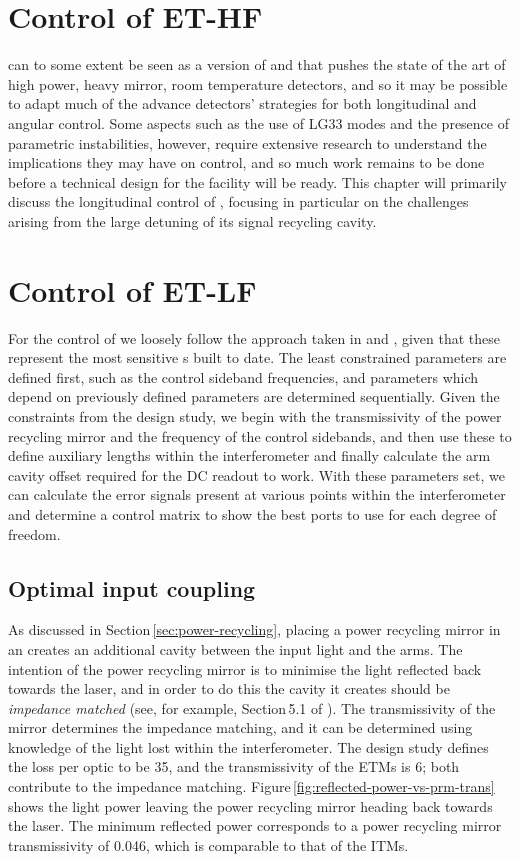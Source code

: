 \section{Control of ET-HF}
\ETHF{} can to some extent be seen as a version of \ALIGO{} and \AVIRGO{} that pushes the state of the art of high power, heavy mirror, room temperature detectors, and so it may be possible to adapt much of the advance detectors' strategies for both longitudinal and angular control. Some aspects such as the use of LG33 modes and the presence of parametric instabilities, however, require extensive research to understand the implications they may have on control, and so much work remains to be done before a technical design for the \ET{} facility will be ready. This chapter will primarily discuss the longitudinal control of \ETLF{}, focusing in particular on the challenges arising from the large detuning of its signal recycling cavity.

\section{Control of ET-LF}
For the control of \ETLF{} we loosely follow the approach taken in \ALIGO{} \cite{Abbott2010} and \AVIRGO{} \cite{Vajente2008}, given that these represent the most sensitive \DRFPMI{}s built to date. The least constrained parameters are defined first, such as the control sideband frequencies, and parameters which depend on previously defined parameters are determined sequentially. Given the constraints from the design study, we begin with the transmissivity of the power recycling mirror and the frequency of the control sidebands, and then use these to define auxiliary lengths within the interferometer and finally calculate the arm cavity offset required for the \gls{DC} readout to work. With these parameters set, we can calculate the error signals present at various points within the interferometer and determine a control matrix to show the best ports to use for each degree of freedom.

\subsection{Optimal input coupling}
As discussed in Section\,\ref{sec:power-recycling}, placing a power recycling mirror in an \MI{} creates an additional cavity between the input light and the arms. The intention of the power recycling mirror is to minimise the light reflected back towards the laser, and in order to do this the cavity it creates should be \emph{impedance matched} (see, for example, Section\,5.1 of \cite{Freise2010}). The transmissivity of the mirror determines the impedance matching, and it can be determined using knowledge of the light lost within the interferometer. The design study defines the loss per optic to be \SI{35}{\ppm}, and the transmissivity of the \glspl{ETM} is \SI{6}{\ppm}; both contribute to the impedance matching. Figure\,\ref{fig:reflected-power-vs-prm-trans} shows the light power leaving the power recycling mirror heading back towards the laser. The minimum reflected power corresponds to a power recycling mirror transmissivity of \num{0.046}, which is comparable to that of the \glspl{ITM}.

